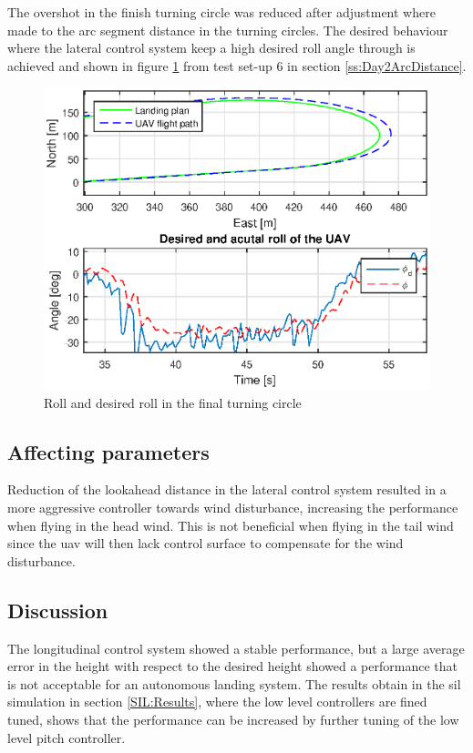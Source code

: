 The overshot in the finish turning circle was reduced after adjustment where made to the arc segment distance in the turning circles. The desired behaviour where the lateral control system keep a high desired roll angle through is achieved and shown in figure \ref{Fig:RollFinalTurning083423} from test set-up 6 in section \ref{ss:Day2ArcDistance}.
\newpage
\begin{figure}[H]
\centering
\includegraphics[scale=0.7]{figs/Experiment/Roll1juni083423.eps}
\caption{Roll and desired roll in the final turning circle}
\label{Fig:RollFinalTurning083423}
\end{figure}
\subsection{Affecting parameters}
Reduction of the lookahead distance in the lateral control system resulted in a more aggressive controller towards wind disturbance, increasing the performance when flying in the head wind. This is not beneficial when flying in the tail wind since the \gls{uav} will then lack control surface to compensate for the wind disturbance.
\subsection{Discussion}
The longitudinal control system showed a stable performance, but a large average error in the height with respect to the desired height showed a performance that is not acceptable for an autonomous landing system. The results obtain in the \gls{sil} simulation in section \ref{SIL:Results}, where the low level controllers are fined tuned, shows that the performance can be increased by further tuning of the low level pitch controller.

